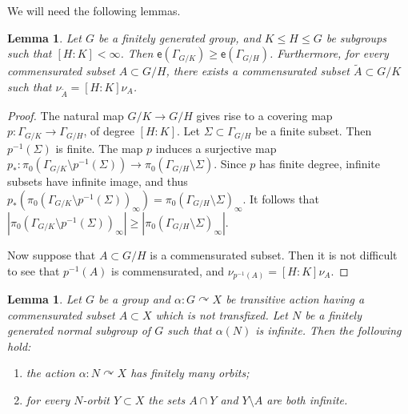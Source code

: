 \documentclass[11pt]{amsart}
\newcommand{\acts}{\ensuremath{\curvearrowright}}%
\newcommand{\esf}{\ensuremath{\mathsf{e}}}
\theoremstyle{definition}
\theoremstyle{plain}
\newtheorem{main thm}{Theorem}
\newtheorem{lemma}[defin]{Lemma}
\theoremstyle{remark}
\theoremstyle{plain}
\begin{document}
We will need the following lemmas.

\begin{lemma}
\label{lem:endsofcoverings}
Let $G$ be a finitely generated group, and $K\le H\le G$ be subgroups such  that $[H:K]<\infty$. Then $\esf(\Gamma_{G/K})\ge \esf(\Gamma_{G/H})$. Furthermore, for every commensurated subset $A\subset G/H$, there exists a commensurated subset $\widetilde{A}\subset G/K$ such that $\nu_{\widetilde{A}}=[H: K] \nu_A$. 


\end{lemma}
\begin{proof}
 The natural map $G/K\to G/H$ gives rise to a covering map $p\colon \Gamma_{G/K}\to \Gamma_{G/H}$, of degree $[H:K]$. Let $\Sigma\subset \Gamma_{G/H}$ be a finite subset. 
  Then $p^{-1}(\Sigma)$ is finite. The map $p$ induces a surjective map $p_\ast \colon\pi_0(\Gamma_{G/K}\setminus p^{-1}(\Sigma))\to \pi_0(\Gamma_{G/H}\setminus \Sigma)$.  Since $p$ has finite degree, infinite subsets have infinite image, and thus $p_\ast(\pi_0(\Gamma_{G/K}\setminus p^{-1}(\Sigma))_\infty)=\pi_0(\Gamma_{G/H}\setminus \Sigma)_\infty$. It follows that 
  $|\pi_0(\Gamma_{G/K}\setminus p^{-1}(\Sigma))_\infty|\ge |\pi_0(\Gamma_{G/H}\setminus \Sigma)_\infty|$. 
  
  Now suppose that $A\subset G/H$ is a commensurated subset. Then it is not difficult to see that $p^{-1}(A)$ is commensurated, and $\nu_{p^{-1}(A)}=[H:K]\nu_A$.  \qedhere
\end{proof}

\begin{lemma} \label{l-reduction-transitive}
	Let $G$ be a group and  $\alpha \colon G\acts X$  be transitive action having a commensurated subset $A\subset X$ which is not transfixed. Let $N$ be a finitely generated normal subgroup of $G$ such that $\alpha(N)$ is infinite. Then the following hold:
	\begin{enumerate}
	
	\item the action $\alpha \colon N \acts X$ has finitely many orbits;
	\item	 for every $N$-orbit $Y\subset X$ the sets $A\cap Y$ and $Y\setminus A$ are both infinite.\end{enumerate}	\end{lemma}
	
\end{document}
